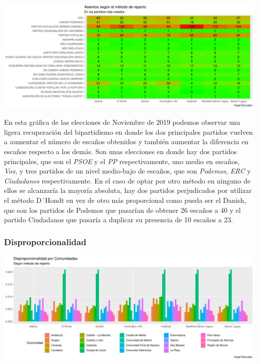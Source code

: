 \documentclass[12pt,a4paper,]{book}
\numberwithin{dummy}{section}
\theoremstyle{ocrenumbox}
\theoremstyle{blacknumex}
\theoremstyle{blacknumbox}
\theoremstyle{ocrenum}
\theoremstyle{ocrenum}
\begin{document}
\begin{center}\includegraphics[width=0.95\linewidth]{figurasR/unnamed-chunk-185-2} \end{center}

En esta gráfica de las elecciones de Noviembre de 2019 podemos observar
una ligera recuperación del bipartidismo en donde los dos principales
partidos vuelven a aumentar el número de escaños obtenidos y también
aumentar la diferencia en escaños respecto a los demás. Son unas
elecciones en donde hay dos partidos principales, que son el \emph{PSOE}
y el \emph{PP} respectivamente, uno medio en escaños, \emph{Vox}, y tres
partidos de un nivel medio-bajo de escaños, que son \emph{Podemos},
\emph{ERC} y \emph{Ciudadanos} respectivamente. En el caso de optar por
otro método en ninguno de ellos se alcanzaría la mayoría absoluta, hay
dos partidos perjudicados por utilizar el método D´Hondt en vez de otro
más proporcional como pueda ser el Danish, que son los partidos de
Podemos que pasarían de obtener 26 escaños a 40 y el partido Ciudadanos
que pasaría a duplicar su presencia de 10 escaños a 23.

\hypertarget{disproporcionalidad-13}{%
\subsubsection{Disproporcionalidad}\label{disproporcionalidad-13}}

\begin{center}\includegraphics[width=0.95\linewidth]{figurasR/unnamed-chunk-186-1} \end{center}
\end{document}
